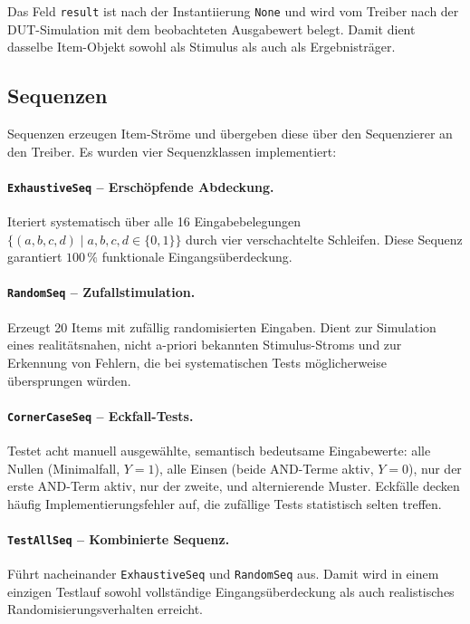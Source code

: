 ﻿\documentclass[12pt,a4paper]{report}
\begin{document}
Das Feld \texttt{result} ist nach der Instantiierung \texttt{None} und wird
vom Treiber nach der DUT-Simulation mit dem beobachteten Ausgabewert belegt.
Damit dient dasselbe Item-Objekt sowohl als Stimulus als auch als Ergebnisträger.

\subsection{Sequenzen}
\label{sssec:sequenzen}

Sequenzen erzeugen Item-Ströme und übergeben diese über den Sequenzierer an den
Treiber. Es wurden vier Sequenzklassen implementiert:

\paragraph{\texttt{ExhaustiveSeq} -- Erschöpfende Abdeckung.}
Iteriert systematisch über alle 16 Eingabebelegungen $\{(a,b,c,d) \mid a,b,c,d \in \{0,1\}\}$
durch vier verschachtelte Schleifen. Diese Sequenz garantiert $100\,\%$
funktionale Eingangsüberdeckung.

\paragraph{\texttt{RandomSeq} -- Zufall\-stimulation.}
Erzeugt 20 Items mit zufällig randomisierten Eingaben. Dient zur Simulation
eines realitätsnahen, nicht a-priori bekannten Stimulus-Stroms und zur
Erkennung von Fehlern, die bei systematischen Tests möglicherweise übersprungen
würden.

\paragraph{\texttt{CornerCaseSeq} -- Eckfall-Tests.}
Testet acht manuell ausgewählte, semantisch bedeutsame Eingabewerte:
alle Nullen (Minimalfall, $Y=1$), alle Einsen (beide AND-Terme aktiv, $Y=0$),
nur der erste AND-Term aktiv, nur der zweite, und alternierende Muster.
Eckfälle decken häufig Implementierungsfehler auf, die zufällige Tests
statistisch selten treffen.

\paragraph{\texttt{TestAllSeq} -- Kombinierte Sequenz.}
Führt nacheinander \texttt{ExhaustiveSeq} und \texttt{Random\newline Seq} aus.
Damit wird in einem einzigen Testlauf sowohl vollständige Eingangsüberdeckung
als auch realistisches Randomisierungsverhalten erreicht.
\end{document}
